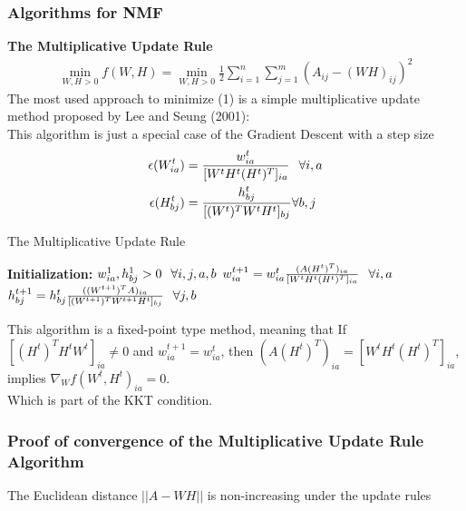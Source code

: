 \documentclass{beamer}
\begin{document}
\begin{spacing}{1.0}
\begin{frame}
\frametitle{Algorithms for NMF}
\textbf{The Multiplicative Update Rule}
\begin{align}
    \min_{W,H>0}f(W,H) = \min_{W,H>0} \frac{1}{2}\sum_{i = 1}^{n}\sum_{j= 1}^{m} (A_{ij} - (WH)_{ij})^{2} \label{op}
\end{align}
The most used approach to minimize (1) is a simple multiplicative update method
proposed by Lee and Seung (2001):\\
This algorithm is just a special case of the Gradient Descent with a step size 
\begin{align*}
    \epsilon(W_{ia}^{t}) &= \frac{w^{t}_{ia}}{[W^{t}H^{t}(H^{t})^{T}]_{ia}}\hspace{0.1in} \forall i,a\\
    \epsilon(H_{bj}^{t}) &= \frac{h^{t}_{bj}}{[(W^{t})^{T}W^{t}H^{t}]_{bj}}\forall b,j  
\end{align*}
\end{frame}
\begin{frame}
\begin{algorithm}[H]
    \caption{The Multiplicative Update Rule}
     \textbf{Initialization:} $w_{ia}^{1}, h_{bj}^{1} > 0 \hspace{0.1in}\forall i,j,a,b$\;
     {
    $w_{ia}^{t+1} = w_{ia}^{t}\frac{(A(H^{t})^{T})_{ia}}{[W^{t}H^{t}(H^{t})^{T}]_{ia}} \hspace{0.1in}\forall i,a$\;
    $h_{bj}^{t+1} = h_{bj}^{t}\frac{((W^{t+1})^{T}A)_{ia}}{[(W^{t+1})^{T}W^{t+1}H^{t}]_{bj}} \hspace{0.1in}\forall j,b$\;}
    \end{algorithm}
\end{frame}
\begin{frame}
        This algorithm is a fixed-point type method, meaning that If $[(H^{t})^{T}H^{t}W^{t}]_{ia} \neq 0$ and
        $w_{ia}^{t+1} = w_{ia}^{t}$, then $(A(H^{t})^{T})_{ia} = [W^{t}H^{t}(H^{t})^{T}]_{ia}$, implies 
        $\nabla_{W}f(W^{t}, H^{t})_{ia} = 0$.\\
        Which is part of the KKT condition.
\end{frame}
\begin{frame}
    \frametitle{Proof of convergence of the Multiplicative Update Rule Algorithm}
    \begin{theorem}
        The Euclidean distance $||A - WH||$ is non-increasing under the update rules
        \begin{align*}

\end{align*}
\end{theorem}
\end{frame}
\end{spacing}
\end{document}
